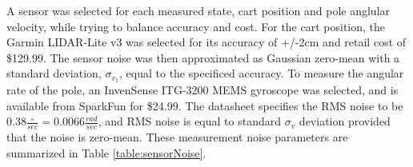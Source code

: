 \documentclass{article}
\begin{document}
A sensor was selected for each measured state, cart position and pole anglular velocity, while trying to balance accuracy and cost. For the cart position, the Garmin LIDAR-Lite v3 was selected for its accuracy of +/-2cm and retail cost of \$129.99\cite{lidarSensor}. The sensor noise was then approximated as Gaussian zero-mean with a standard deviation, $\sigma_{v_1}$, equal to the specificed accuracy. To measure the angular rate of the pole, an InvenSense ITG-3200 MEMS gyroscope was selected, and is available from SparkFun for \$24.99. The datasheet\cite{gyroSensor} specifies the RMS noise to be $0.38\frac{\circ{}}{sec}=0.0066\frac{rad}{sec}$, and RMS noise is equal to standard $\sigma_v$ deviation provided that the noise is zero-mean. These measurement noise parameters are summarized in Table \ref{table:sensorNoise}.
\end{document}
